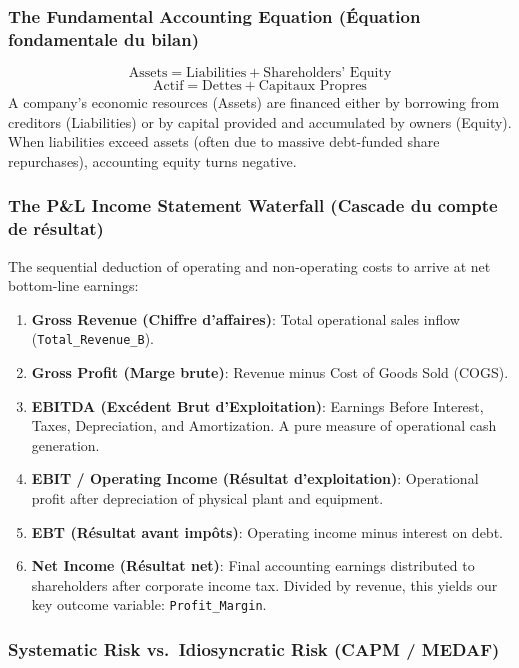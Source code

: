 \documentclass[
]{article}
\providecommand{\tightlist}{%
  \setlength{\itemsep}{0pt}\setlength{\parskip}{0pt}}
\begin{document}
\subsubsection{The Fundamental Accounting Equation (Équation
fondamentale du
bilan)}\label{the-fundamental-accounting-equation-uxe9quation-fondamentale-du-bilan}

\[\text{Assets} = \text{Liabilities} + \text{Shareholders' Equity}\]
\[\text{Actif} = \text{Dettes} + \text{Capitaux Propres}\] A company's
economic resources (Assets) are financed either by borrowing from
creditors (Liabilities) or by capital provided and accumulated by owners
(Equity). When liabilities exceed assets (often due to massive
debt-funded share repurchases), accounting equity turns negative.

\subsubsection{The P\&L Income Statement Waterfall (Cascade du compte de
résultat)}\label{the-pl-income-statement-waterfall-cascade-du-compte-de-ruxe9sultat}

The sequential deduction of operating and non-operating costs to arrive
at net bottom-line earnings:

\begin{enumerate}
\def\labelenumi{\arabic{enumi}.}
\tightlist
\item
  \textbf{Gross Revenue (Chiffre d'affaires)}: Total operational sales
  inflow (\texttt{Total\_Revenue\_B}).
\item
  \textbf{Gross Profit (Marge brute)}: Revenue minus Cost of Goods Sold
  (COGS).
\item
  \textbf{EBITDA (Excédent Brut d'Exploitation)}: Earnings Before
  Interest, Taxes, Depreciation, and Amortization. A pure measure of
  operational cash generation.
\item
  \textbf{EBIT / Operating Income (Résultat d'exploitation)}:
  Operational profit after depreciation of physical plant and equipment.
\item
  \textbf{EBT (Résultat avant impôts)}: Operating income minus interest
  on debt.
\item
  \textbf{Net Income (Résultat net)}: Final accounting earnings
  distributed to shareholders after corporate income tax. Divided by
  revenue, this yields our key outcome variable:
  \texttt{Profit\_Margin}.
\end{enumerate}

\subsubsection{Systematic Risk vs.~Idiosyncratic Risk (CAPM /
MEDAF)}\label{systematic-risk-vs.-idiosyncratic-risk-capm-medaf}
\end{document}
